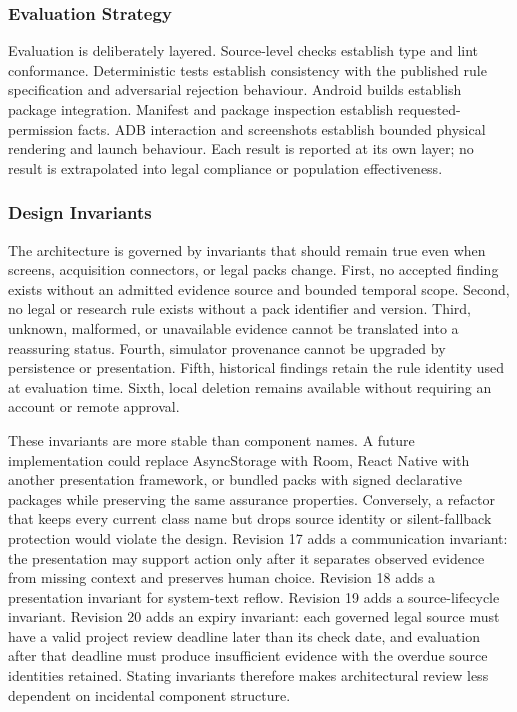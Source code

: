 \subsubsection{Evaluation Strategy}

Evaluation is deliberately layered. Source-level checks establish type and lint conformance. Deterministic tests establish consistency with the published rule specification and adversarial rejection behaviour. Android builds establish package integration. Manifest and package inspection establish requested-permission facts. ADB interaction and screenshots establish bounded physical rendering and launch behaviour. Each result is reported at its own layer; no result is extrapolated into legal compliance or population effectiveness.

\subsubsection{Design Invariants}

The architecture is governed by invariants that should remain true even when screens, acquisition connectors, or legal packs change. First, no accepted finding exists without an admitted evidence source and bounded temporal scope. Second, no legal or research rule exists without a pack identifier and version. Third, unknown, malformed, or unavailable evidence cannot be translated into a reassuring status. Fourth, simulator provenance cannot be upgraded by persistence or presentation. Fifth, historical findings retain the rule identity used at evaluation time. Sixth, local deletion remains available without requiring an account or remote approval.

These invariants are more stable than component names. A future implementation could replace AsyncStorage with Room, React Native with another presentation framework, or bundled packs with signed declarative packages while preserving the same assurance properties. Conversely, a refactor that keeps every current class name but drops source identity or silent-fallback protection would violate the design. Revision 17 adds a communication invariant: the presentation may support action only after it separates observed evidence from missing context and preserves human choice. Revision 18 adds a presentation invariant for system-text reflow. Revision 19 adds a source-lifecycle invariant. Revision 20 adds an expiry invariant: each governed legal source must have a valid project review deadline later than its check date, and evaluation after that deadline must produce insufficient evidence with the overdue source identities retained. Stating invariants therefore makes architectural review less dependent on incidental component structure.

